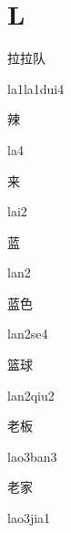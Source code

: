 ﻿%
\section*{L}

\begin{verbete}[la1la1dui4]{拉拉队}
\begin{pronuncia}{la1la1dui4}
\end{pronuncia}
\end{verbete}

\begin{verbete}[la4]{辣}
\begin{pronuncia}{la4}
\end{pronuncia}
\end{verbete}

\begin{verbete}[lai2]{来}
\begin{pronuncia}{lai2}
\end{pronuncia}
\end{verbete}

\begin{verbete}[lan2]{蓝}
\begin{pronuncia}{lan2}
\end{pronuncia}
\end{verbete}

\begin{verbete}[lan2se4]{蓝色}
\begin{pronuncia}{lan2se4}
\end{pronuncia}
\end{verbete}

\begin{verbete}{篮球}
\begin{pronuncia}{lan2qiu2}
\end{pronuncia}
\end{verbete}

\begin{verbete}{老板}
\begin{pronuncia}{lao3ban3}
\end{pronuncia}
\end{verbete}

\begin{verbete}{老家}
\begin{pronuncia}{lao3jia1}
\end{pronuncia}
\end{verbete}

